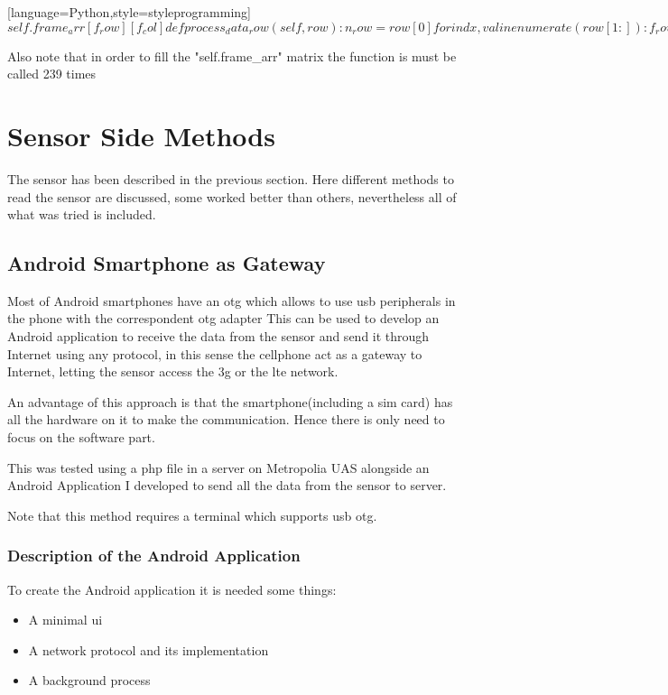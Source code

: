 \documentclass[hidelinks,11pt,a4paper,oneside,article]{memoir}
\begin{document}
[language=Python,style=styleprogramming]$
self.frame_arr[f_row][f_col]

def process_data_row(self, row):
    n_row = row[0]
    
    for indx, val in enumerate(row[1:]):
        f_row = (n_row)/2
        f_col = (n_row) %
        self.frame_arr[f_row][f_col] = val
$ 

Also note that in order to fill the "self.frame{\_}arr" matrix the function is must be called 239 times

\section{Sensor Side Methods}
The sensor has been described in the previous section. Here different methods to read the sensor are discussed, some worked better than others, nevertheless all of what was tried is included.

\subsection{Android Smartphone as Gateway}
Most of Android smartphones have an \gls{otg} which allows to use \gls{usb} peripherals in the phone with the correspondent \gls{otg} adapter This can be used to develop an Android application to receive the data from the sensor and send it through Internet using any protocol, in this sense the cellphone act as a gateway to Internet, letting the sensor access the \gls{3g} or the \gls{lte} network.

An advantage of this approach is that the smartphone(including a \gls{sim} card) has all the hardware on it to make the communication. Hence there is only need to focus on the software part.

This was tested using a \gls{php} file in a server on Metropolia UAS alongside an Android Application I developed to send all the data from the sensor to server.

Note that this method requires  a terminal which supports \gls{usb} \gls{otg}.

\subsubsection{Description of the Android Application}
To create the Android application it is needed some things:
\begin{itemize}
	\item A minimal \gls{ui}
	\item A network protocol and its implementation
	\item A background process
\end{itemize}
\end{document}
